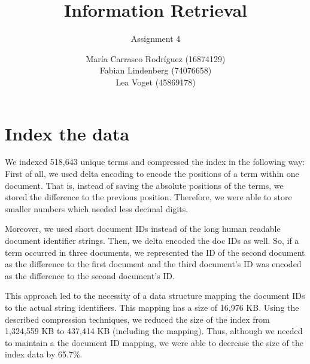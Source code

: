 \documentclass[a4paper,11pt,oneside]{book}
\title{Information Retrieval }
\subtitle{Assignment 4}
\author{ María Carrasco Rodríguez (16874129) \\
		Fabian Lindenberg (74076658) \\
		Lea Voget (45869178)}
\begin{document}
\kostspieligmaketitle


\setcounter{chapter}{2}
\chapter{Index the data}

We indexed 518,643  unique terms and compressed the index in the following way: First of all, we used delta encoding to encode the positions of a term within one document. That is, instead of saving the absolute positions of the terms, we stored the difference to the previous position. Therefore, we were able to store smaller numbers which needed less decimal digits.

Moreover, we used short document IDs instead of the long human readable document identifier strings. Then, we delta encoded the doc IDs as well. So, if a term occurred in three documents, we represented the ID of the second document as the difference to the first document and the third document's ID was encoded as the difference to the second document's ID.

This approach led to the necessity of a data structure mapping the document IDs to the actual string identifiers. This mapping has a size of 16,976 KB. Using the described compression techniques, we reduced the size of the index from 1,324,559 KB to 437,414 KB (including the mapping). Thus, although we needed to maintain a the document ID mapping, we were able to decrease the size of the index data by 65.7\%.
\end{document}
